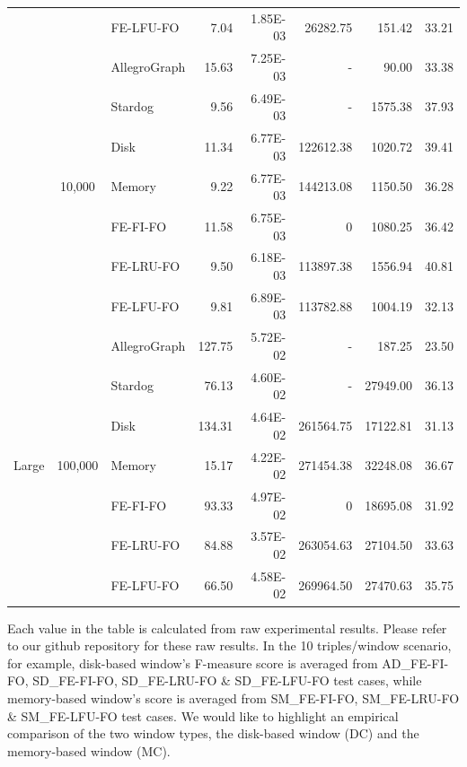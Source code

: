 \begin{table}[!htbp]
{\begin{tabular}{|c|c|l|r|r|r|r|r|}
&& FE-LFU-FO & 7.04 & 1.85E-03 & 26282.75 & 151.42 & 33.21 \\ \cline{2-8} 
& \multirow{7}{*}{10,000} &AllegroGraph& 15.63 & 7.25E-03 & - & 90.00 & 33.38 \\
&&Stardog& 9.56 & 6.49E-03 & - & 1575.38 & 37.93 \\ \cline{3-8} 
&& Disk & 11.34 & 6.77E-03 & 122612.38 & 1020.72 & 39.41 \\
&& Memory & 9.22 & 6.77E-03 & 144213.08 & 1150.50 & 36.28 \\ \cline{3-8} 
&& FE-FI-FO & 11.58 & 6.75E-03 & 0 & 1080.25 & 36.42 \\
&& FE-LRU-FO & 9.50 & 6.18E-03 & 113897.38 & 1556.94 & 40.81 \\
&& FE-LFU-FO & 9.81 & 6.89E-03 & 113782.88 & 1004.19 & 32.13 \\ \hline
\multirow{7}{*}{Large} & \multirow{7}{*}{100,000} &AllegroGraph& 127.75 & 5.72E-02 & - & 187.25 & 23.50 \\
&&Stardog& 76.13 & 4.60E-02 & - & 27949.00 & 36.13 \\ \cline{3-8} 
&& Disk & 134.31 & 4.64E-02 & 261564.75 & 17122.81 & 31.13 \\
&& Memory & 15.17 & 4.22E-02 & 271454.38 & 32248.08 & 36.67 \\ \cline{3-8} 
&& FE-FI-FO & 93.33 & 4.97E-02 & 0 & 18695.08 & 31.92 \\
&& FE-LRU-FO & 84.88 & 3.57E-02 & 263054.63 & 27104.50 & 33.63 \\
&& FE-LFU-FO & 66.50 & 4.58E-02 & 269964.50 & 27470.63 & 35.75 \\ \hline
\end{tabular}
}
\end{table}
Each value in the table is calculated from raw experimental results.
Please refer to our github repository for these raw results. 
In the 10 triples/window scenario, for example, 
disk-based window's F-measure score is averaged from AD\_FE-FI-FO, SD\_FE-FI-FO, SD\_FE-LRU-FO \& SD\_FE-LFU-FO test cases, 
while memory-based window's score is averaged from SM\_FE-FI-FO, SM\_FE-LRU-FO \& SM\_FE-LFU-FO test cases.
We would like to highlight an empirical comparison of the two window types, the disk-based window (DC) and the memory-based window (MC).

